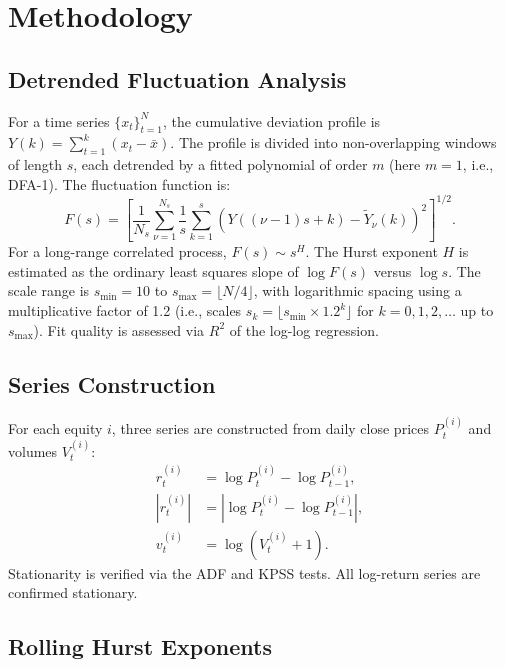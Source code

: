 \documentclass[preprint,12pt,authoryear]{elsarticle}
\begin{document}
\section{Methodology}
\label{sec:methods}

\subsection{Detrended Fluctuation Analysis}

For a time series $\{x_t\}_{t=1}^{N}$, the cumulative deviation profile is $Y(k) = \sum_{t=1}^{k}(x_t - \bar{x})$. The profile is divided into non-overlapping windows of length $s$, each detrended by a fitted polynomial of order $m$ (here $m = 1$, i.e., DFA-1). The fluctuation function is:
\begin{equation}
F(s) = \left[ \frac{1}{N_s} \sum_{\nu=1}^{N_s} \frac{1}{s} \sum_{k=1}^{s} \left( Y((\nu-1)s + k) - \tilde{Y}_\nu(k) \right)^2 \right]^{1/2}.
\end{equation}
For a long-range correlated process, $F(s) \sim s^H$. The Hurst exponent $H$ is estimated as the ordinary least squares slope of $\log F(s)$ versus $\log s$. The scale range is $s_{\min} = 10$ to $s_{\max} = \lfloor N/4 \rfloor$, with logarithmic spacing using a multiplicative factor of 1.2 (i.e., scales $s_k = \lfloor s_{\min} \times 1.2^k \rfloor$ for $k = 0, 1, 2, \ldots$ up to $s_{\max}$). Fit quality is assessed via $R^2$ of the log-log regression.

\subsection{Series Construction}

For each equity $i$, three series are constructed from daily close prices $P_t^{(i)}$ and volumes $V_t^{(i)}$:
\begin{align}
r_t^{(i)} &= \log P_t^{(i)} - \log P_{t-1}^{(i)}, \\
|r_t^{(i)}| &= |\log P_t^{(i)} - \log P_{t-1}^{(i)}|, \\
v_t^{(i)} &= \log(V_t^{(i)} + 1).
\end{align}
Stationarity is verified via the ADF and KPSS tests. All log-return series are confirmed stationary.

\subsection{Rolling Hurst Exponents}
\label{sec:rolling_hurst}
\end{document}
